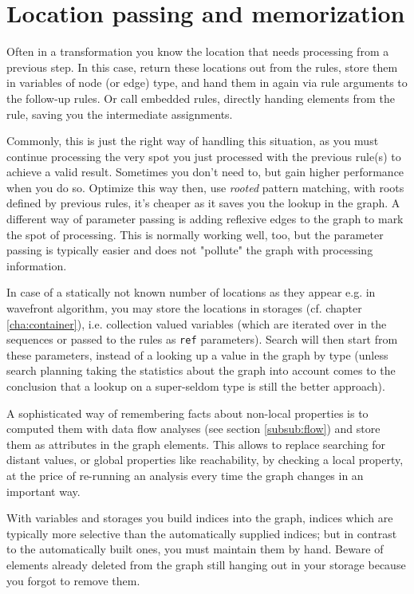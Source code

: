 \section{Location passing and memorization}
Often in a transformation you know the location that needs processing from a previous step.
In this case, return these locations out from the rules, store them in variables of node (or edge) type, and hand them in again via rule arguments to the follow-up rules.
Or call embedded rules, directly handing elements from the rule, saving you the intermediate assignments.

Commonly, this is just the right way of handling this situation, 
as you must continue processing the very spot you just processed with the previous rule(s) to achieve a valid result.
Sometimes you don't need to, but gain higher performance when you do so.
Optimize this way then, use \emph{rooted} pattern matching, with roots defined by previous rules, it's cheaper as it saves you the lookup in the graph.
A different way of parameter passing is adding reflexive edges to the graph to mark the spot of processing.
This is normally working well, too, but the parameter passing is typically easier and does not "pollute" the graph with processing information.

In case of a statically not known number of locations as they appear e.g. in wavefront algorithm, you may store the locations in storages (cf. chapter \ref{cha:container}), i.e. collection valued variables (which are iterated over in the sequences or passed to the rules as \texttt{ref} parameters).
Search will then start from these parameters, instead of a looking up a value in the graph by type (unless search planning taking the statistics about the graph into account comes to the conclusion that a lookup on a super-seldom type is still the better approach).

A sophisticated way of remembering facts about non-local properties is to computed them with data flow analyses (see section \ref{subsub:flow}) and store them as attributes in the graph elements.
This allows to replace searching for distant values, or global properties like reachability, by checking a local property, at the price of re-running an analysis every time the graph changes in an important way.

With variables and storages you build indices into the graph, indices which are typically more selective than the automatically supplied indices; 
but in contrast to the automatically built ones, you must maintain them by hand.
Beware of elements already deleted from the graph still hanging out in your storage because you forgot to remove them.

